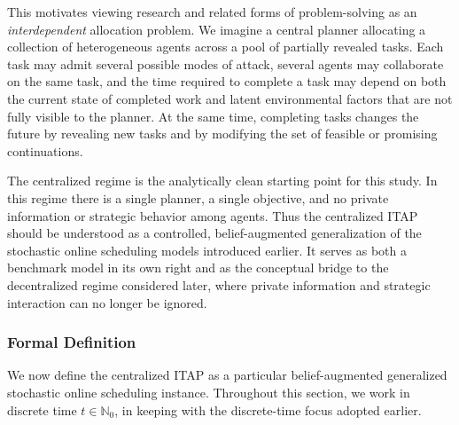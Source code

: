 This motivates viewing research and related forms of problem-solving as an \emph{interdependent} allocation problem. We imagine a central planner allocating a collection of heterogeneous agents across a pool of partially revealed tasks. Each task may admit several possible modes of attack, several agents may collaborate on the same task, and the time required to complete a task may depend on both the current state of completed work and latent environmental factors that are not fully visible to the planner. At the same time, completing tasks changes the future by revealing new tasks and by modifying the set of feasible or promising continuations.

The centralized regime is the analytically clean starting point for this study. In this regime there is a single planner, a single objective, and no private information or strategic behavior among agents. Thus the centralized ITAP should be understood as a controlled, belief-augmented generalization of the stochastic online scheduling models introduced earlier. It serves as both a benchmark model in its own right and as the conceptual bridge to the decentralized regime considered later, where private information and strategic interaction can no longer be ignored.

\subsubsection{Formal Definition}

We now define the centralized ITAP as a particular belief-augmented generalized stochastic online scheduling instance. Throughout this section, we work in discrete time \(t\in\mathbb N_0\), in keeping with the discrete-time focus adopted earlier.

